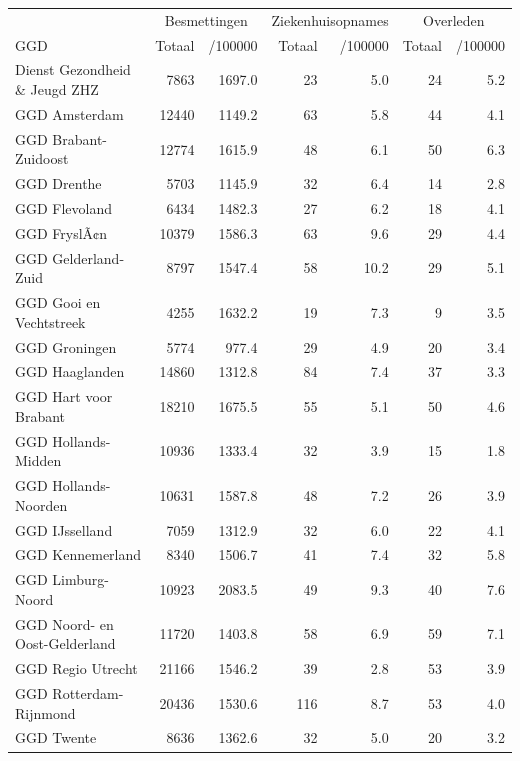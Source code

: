 \documentclass[
  english,
  man,floatsintext]{apa6}
\begin{document}
\begin{table}
\centering\begingroup\fontsize{10}{12}\selectfont

\begin{threeparttable}
\begin{tabular}{lrrrrrr}
\toprule
\multicolumn{1}{c}{ } & \multicolumn{2}{c}{Besmettingen} & \multicolumn{2}{c}{Ziekenhuisopnames} & \multicolumn{2}{c}{Overleden} \\
\cmidrule(l{3pt}r{3pt}){2-3} \cmidrule(l{3pt}r{3pt}){4-5} \cmidrule(l{3pt}r{3pt}){6-7}
GGD & Totaal & /100000 & Totaal & /100000 & Totaal & /100000\\
\midrule
Dienst Gezondheid \& Jeugd ZHZ & 7863 & 1697.0 & 23 & 5.0 & 24 & 5.2\\
GGD Amsterdam & 12440 & 1149.2 & 63 & 5.8 & 44 & 4.1\\
GGD Brabant-Zuidoost & 12774 & 1615.9 & 48 & 6.1 & 50 & 6.3\\
GGD Drenthe & 5703 & 1145.9 & 32 & 6.4 & 14 & 2.8\\
GGD Flevoland & 6434 & 1482.3 & 27 & 6.2 & 18 & 4.1\\
GGD FryslÃ¢n & 10379 & 1586.3 & 63 & 9.6 & 29 & 4.4\\
GGD Gelderland-Zuid & 8797 & 1547.4 & 58 & 10.2 & 29 & 5.1\\
GGD Gooi en Vechtstreek & 4255 & 1632.2 & 19 & 7.3 & 9 & 3.5\\
GGD Groningen & 5774 & 977.4 & 29 & 4.9 & 20 & 3.4\\
GGD Haaglanden & 14860 & 1312.8 & 84 & 7.4 & 37 & 3.3\\
GGD Hart voor Brabant & 18210 & 1675.5 & 55 & 5.1 & 50 & 4.6\\
GGD Hollands-Midden & 10936 & 1333.4 & 32 & 3.9 & 15 & 1.8\\
GGD Hollands-Noorden & 10631 & 1587.8 & 48 & 7.2 & 26 & 3.9\\
GGD IJsselland & 7059 & 1312.9 & 32 & 6.0 & 22 & 4.1\\
GGD Kennemerland & 8340 & 1506.7 & 41 & 7.4 & 32 & 5.8\\
GGD Limburg-Noord & 10923 & 2083.5 & 49 & 9.3 & 40 & 7.6\\
GGD Noord- en Oost-Gelderland & 11720 & 1403.8 & 58 & 6.9 & 59 & 7.1\\
GGD Regio Utrecht & 21166 & 1546.2 & 39 & 2.8 & 53 & 3.9\\
GGD Rotterdam-Rijnmond & 20436 & 1530.6 & 116 & 8.7 & 53 & 4.0\\
GGD Twente & 8636 & 1362.6 & 32 & 5.0 & 20 & 3.2\\

\end{tabular}
\end{threeparttable}
\end{table}
\end{document}
